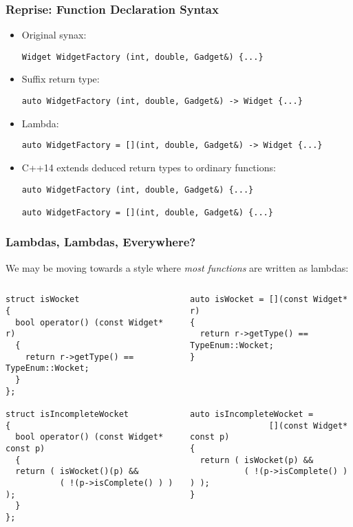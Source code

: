 \begin{frame}[fragile,t]
\frametitle{Reprise: Function Declaration Syntax}
\begin{itemize}
\item Original synax:
{\scriptsize\begin{verbatim}
Widget WidgetFactory (int, double, Gadget&) {...}
\end{verbatim}
}
\pause{}
\vskip 6pt
\item Suffix return type:
{\scriptsize\begin{verbatim}
auto WidgetFactory (int, double, Gadget&) -> Widget {...}
\end{verbatim}
}
\pause{}
\vskip 6pt
\item Lambda:
{\scriptsize\begin{verbatim}
auto WidgetFactory = [](int, double, Gadget&) -> Widget {...}
\end{verbatim}
}
\pause{}
\vskip 6pt
\item C++14 extends deduced return types to ordinary functions:
{\scriptsize\begin{verbatim}
auto WidgetFactory (int, double, Gadget&) {...}

auto WidgetFactory = [](int, double, Gadget&) {...}
\end{verbatim}
}
\end{itemize}
\end{frame}
 

\begin{frame}[fragile,t]
\frametitle{Lambdas, Lambdas, Everywhere?}
We may be moving towards a style where \emph{most functions} are
written as lambdas:
\begin{columns}[t]
{\scriptsize\begin{verbatim}
struct isWocket 
{
  bool operator() (const Widget* r) 
  {
    return r->getType() == TypeEnum::Wocket;
  }
};

struct isIncompleteWocket
{
  bool operator() (const Widget* const p)
  {
  return ( isWocket()(p) && 
           ( !(p->isComplete() ) ) );
  }
};
\end{verbatim}
}
\pause{}
{\scriptsize\begin{verbatim}
auto isWocket = [](const Widget* r)
{  
  return r->getType() == TypeEnum::Wocket;
}




auto isIncompleteWocket = 
                [](const Widget* const p)
{
  return ( isWocket(p) && 
           ( !(p->isComplete() ) ) ); 
}
\end{verbatim}
}
\end{columns}

\end{frame}


